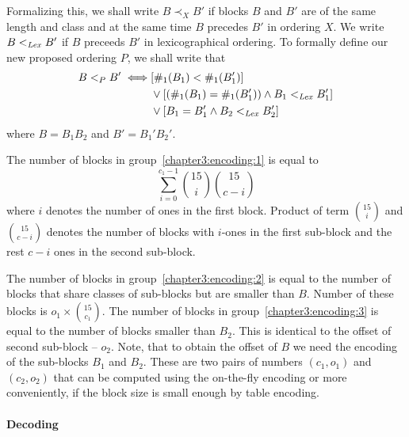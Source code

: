 Formalizing this, we shall write $B\prec_X B'$ if blocks $B$ and $B'$ are of
the same length and class and at the same time $B$ precedes $B'$ in ordering $X$.
We write $B<_{\mathit{Lex}} B'$ if $B$ preceeds $B'$ in lexicographical
ordering. To formally define our new proposed ordering $P$, we shall write that
\begin{align*}
    B<_P B' \iff
    &[\#_1(B_1) < \#_1(B_1')] \\
    &\lor [(\#_1(B_1) = \#_1(B_1')) \land B_1 <_{\mathit{Lex}} B_1']\\
    &\lor [B_1 = B_1' \land B_2 <_{\mathit{Lex}} B_2']
\end{align*}
where $B=B_1B_2$ and $B'=B_1'B_2'$.

The number of blocks in group~\ref{chapter3:encoding:1} is equal to
$$\sum_{i=0}^{c_1-1} {15\choose i} {15\choose c-i}$$ where $i$ denotes the number
of ones in the first block. Product of term ${15\choose i}$ and ${15\choose c-i}$
denotes the number of blocks with $i$-ones in the first sub-block and the rest
$c-i$ ones in the second sub-block.

The number of blocks in group~\ref{chapter3:encoding:2} is equal to the number of blocks that
share classes of sub-blocks but are smaller than $B$. Number of these blocks is $o_1\times {15\choose c_1}$.
The number of blocks in group~\ref{chapter3:encoding:3} is equal to the number of blocks smaller 
than $B_2$. This is identical to the offset of second sub-block -- $o_2$. Note, that to obtain the
offset of $B$ we need the encoding of the sub-blocks $B_1$ and $B_2$. These are two pairs of numbers
$(c_1, o_1)$ and $(c_2, o_2)$ that can be computed using the on-the-fly encoding or more conveniently,
if the block size is small enough by table encoding.

\paragraph{Decoding}

